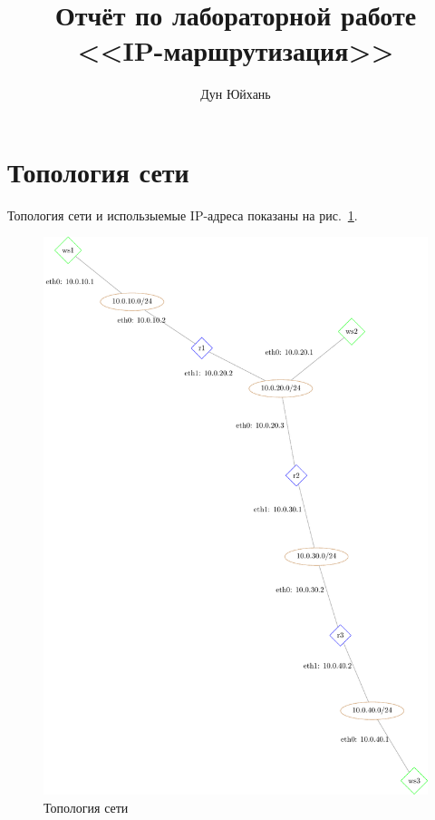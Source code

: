 \documentclass[a4paper,12pt]{article}
\title{Отчёт по лабораторной работе \\ <<IP-маршрутизация>>}
\author{Дун Юйхань}
\begin{document}
\maketitle

\tableofcontents


\section{Топология сети}

Топология сети и использыемые IP-адреса показаны на рис.~\ref{fig:network}.

\begin{figure}
\centering
\includegraphics[width=\textwidth]{includes/network_gv.pdf}
\caption{Топология сети}
\label{fig:network}
\end{figure}
\end{document}
